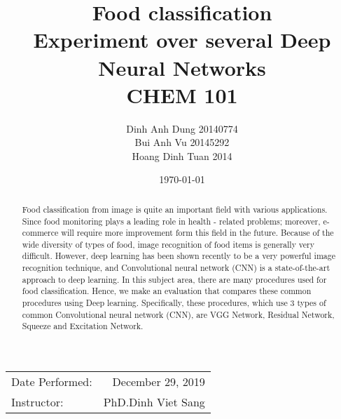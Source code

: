 \documentclass{article}
\title{Food classification\\ Experiment over several Deep Neural Networks \\ CHEM 101} %
\author{Dinh Anh Dung \textsc{20140774}\\ Bui Anh Vu \textsc{20145292} \\ Hoang Dinh Tuan \textsc{2014}} %
\date{\today} %
\begin{document}
\maketitle %

\begin{center}
\begin{tabular}{l r}
Date Performed: & December 29, 2019 \\ %
Instructor: & PhD.Dinh Viet Sang %
\end{tabular}
\end{center}

 \begin{abstract}
Food classification from image is quite an important field with various applications. Since food monitoring plays a leading role in health - related problems; moreover, e-commerce will require more improvement form this field in the future. Because of the wide diversity of types of food, image recognition of food items is generally very difficult. However, deep learning has been shown recently to be a very powerful image recognition technique, and Convolutional neural network (CNN) is a state-of-the-art approach to deep learning. In this subject area, there are many procedures used for food classification.  Hence, we make an evaluation that compares these common procedures using Deep learning. Specifically, these procedures, which use 3 types of common Convolutional neural network (CNN), are VGG Network, Residual Network, Squeeze and Excitation Network.
 \end{abstract}





\printbibliography
\end{document}
